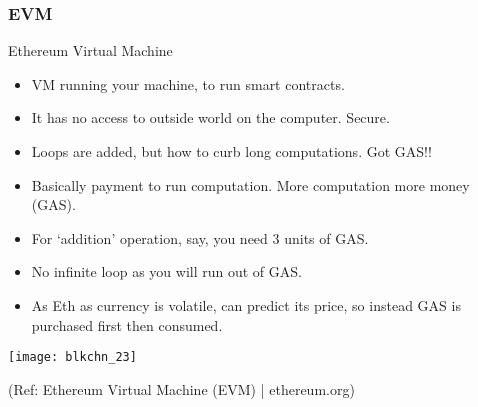\begin{frame}[fragile]\frametitle{EVM}
Ethereum Virtual Machine

\begin{itemize}
\item VM running your machine, to run smart contracts.
\item It has no access to outside world on the computer. Secure.
\item Loops are added, but how to curb long computations. Got GAS!!
\item Basically payment to run computation. More computation more money (GAS). 
\item For `addition' operation, say, you need 3 units of GAS.
\item No infinite loop as you will run out of GAS.
\item As Eth as currency is volatile, can predict its price, so instead GAS is purchased first then consumed.
\end{itemize}

\begin{center}
\texttt{[image: blkchn\_23]}

{\tiny (Ref: Ethereum Virtual Machine (EVM) | ethereum.org)}
\end{center}

\end{frame}



